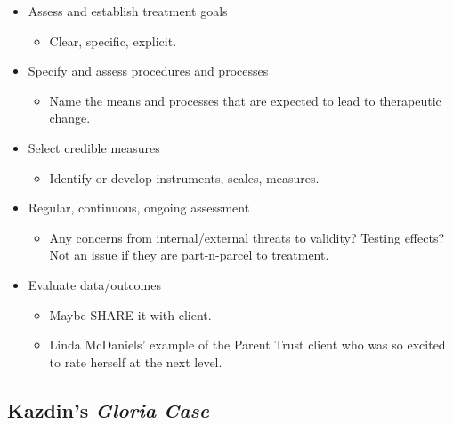 \documentclass[
  english,
]{book}
\providecommand{\tightlist}{%
  \setlength{\itemsep}{0pt}\setlength{\parskip}{0pt}}
\begin{document}
\begin{itemize}
\tightlist
\item
  Assess and establish treatment goals\citep{morgan_single-participant_2001}

  \begin{itemize}
  \tightlist
  \item
    Clear, specific, explicit.
  \end{itemize}
\item
  Specify and assess procedures and processes

  \begin{itemize}
  \tightlist
  \item
    Name the means and processes that are expected to lead to therapeutic change.
  \end{itemize}
\item
  Select credible measures

  \begin{itemize}
  \tightlist
  \item
    Identify or develop instruments, scales, measures.
  \end{itemize}
\item
  Regular, continuous, ongoing assessment

  \begin{itemize}
  \tightlist
  \item
    Any concerns from internal/external threats to validity? Testing effects? Not an issue if they are part-n-parcel to treatment.
  \end{itemize}
\item
  Evaluate data/outcomes

  \begin{itemize}
  \tightlist
  \item
    Maybe SHARE it with client.
  \item
    Linda McDaniels' example of the Parent Trust client who was so excited to rate herself at the next level.
  \end{itemize}
\end{itemize}

\hypertarget{kazdins--kazdin_research_2017-gloria-case}{%
\subsection{\texorpdfstring{Kazdin's \citeyearpar{kazdin_research_2017} \emph{Gloria Case}}{Kazdin's {[}-@kazdin\_research\_2017{]} Gloria Case}}\label{kazdins--kazdin_research_2017-gloria-case}}
\end{document}
